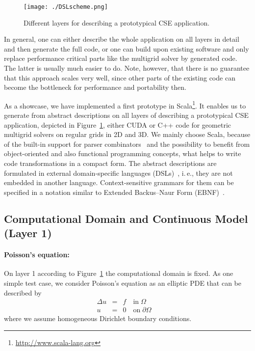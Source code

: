 \documentclass[onecolumn]{svjour3}
\begin{document}
\begin{figure}[ht!]
\begin{center}
\texttt{[image: ./DSLscheme.png]}
\caption[Partitioning of a cell-centered grid into four sub-grids]{Different layers for describing a prototypical CSE application.}
\label{fig:applevels}
\end{center}
\end{figure}

In general, one can either describe the whole application on all layers in detail and then generate the full code, or one can build upon existing software and only replace performance critical parts like the multigrid solver by generated code. The latter is usually much easier to do. Note, however, that there is no guarantee that this approach scales very well, since other parts of the existing code can become the bottleneck for performance and portability then. 

As a showcase, we have implemented a first prototype in Scala\footnote{\url{http://www.scala-lang.org}}. It enables us to generate from abstract descriptions on all layers of describing a prototypical CSE application, depicted in Figure~\ref{fig:applevels}, either CUDA or C++ code for geometric multigrid solvers on regular grids in 2D and 3D.
We mainly choose Scala, because of the built-in support for parser combinators~\cite{odersky2008programming} and the possibility to benefit from object-oriented and also functional programming concepts, what helps to write code transformations in a compact form. The abstract descriptions are formulated in external domain-specific languages (DSLs)~\cite{ghosh2010dsls}, i.\,e., they are not embedded in another language. Context-sensitive grammars for them can be specified in a notation similar to Extended Backus–Naur Form (EBNF)~\cite{garshol2003bnf}.  



\subsection{Computational Domain and Continuous Model (Layer 1)}

\paragraph{Poisson's equation:} On layer 1 according to Figure~\ref{fig:applevels} the computational domain is fixed. As one simple test case, we consider Poisson's equation as an elliptic PDE that can be described by  
\begin{subequations} \label{eq:homodiffusion}
\begin{eqnarray}  
 \Delta u &=& f \quad \text{in} \; \Omega \\
   u  &=& 0 \quad \text{on} \; \partial \Omega \quad 
\end{eqnarray}
\end{subequations}
where we assume homogeneous Dirichlet boundary conditions.
\end{document}
